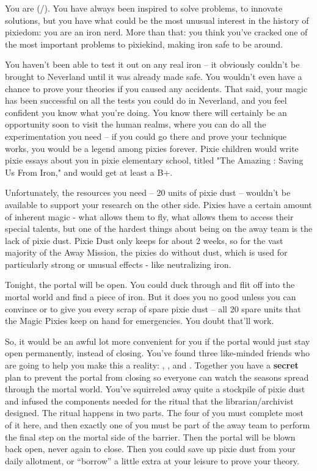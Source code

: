 \documentclass[char]{PP}
\begin{document}
\name{\cMIron{}}

You are \cMIron{} (\cMIron{\they}/\cMIron{\them}).  You have always been inspired to solve problems, to innovate solutions, but you have what could be the most unusual interest in the history of pixiedom: you are an iron nerd.  More than that: you think you've cracked one of the most important problems to pixiekind, making iron safe to be around.

You haven't been able to test it out on any real iron – it obviously couldn't be brought to Neverland until it was already made safe.  You wouldn't even have a chance to prove your theories if you caused any accidents.  That said, your magic has been successful on all the tests you could do in Neverland, and you feel confident you know what you're doing.  You know there will certainly be an opportunity soon to visit the human realms, where you can do all the experimentation you need – if you could go there and prove your technique works, you would be a legend among pixies forever.  Pixie children would write pixie essays about you in pixie elementary school, titled "The Amazing \cMIron{}: Saving Us From Iron," and would get at least a B+.

Unfortunately, the resources you need – 20 units of pixie dust – wouldn’t be available to support your research on the other side. Pixies have a certain amount of inherent magic - what allows them to fly, what allows them to access their special talents, but one of the hardest things about being on the away team is the lack of pixie dust. Pixie Dust only keeps for about 2 weeks, so for the vast majority of the Away Mission, the pixies do without dust, which is used for particularly strong or unusual effects - like neutralizing iron.

Tonight, the portal will be open. You could duck through and flit off into the mortal world and find a piece of iron. But it does you no good unless you can convince \cMHead{} or \cMTree{} to give you every scrap of spare pixie dust -- all 20 spare units that the Magic Pixies keep on hand for emergencies. You doubt that’ll work.

So, it would be an awful lot more convenient for you if the portal would just stay open permanently, instead of closing. You’ve found three like-minded friends who are going to help you make this a reality: \cSLibrarian{}, \cFHeart{}, and \cESweet{}. Together you have a \textbf{secret} plan to prevent the portal from closing so everyone can watch the seasons spread through the mortal world. You’ve squirreled away quite a stockpile of pixie dust and infused the components needed for the ritual that the librarian/archivist designed. The ritual happens in two parts. The four of you must complete most of it here, and then exactly one of you must be part of the away team to perform the final step on the mortal side of the barrier. Then the portal will be blown back open, never again to close. Then you could save up pixie dust from your daily allotment, or “borrow” a little extra at your leisure to prove your theory.
\end{document}
